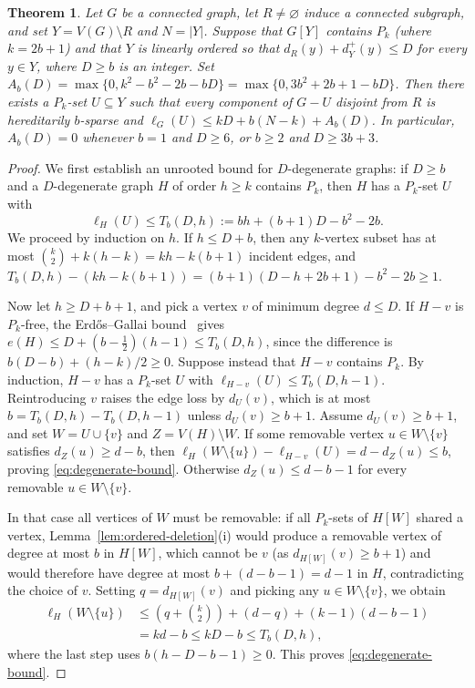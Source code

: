\documentclass[10pt]{article}
\theoremstyle{compactplain}
\newtheorem{theorem}{Theorem}[section]
\theoremstyle{remark}\newtheorem{remark}[theorem]{Remark}
\begin{document}
\begin{theorem}\label{thm:rooted-deletion}
Let $G$ be a connected graph, let $R\ne\varnothing$ induce a connected
subgraph, and set $Y=V(G)\setminus R$ and $N=|Y|$. Suppose that $G[Y]$
contains $P_k$ (where $k=2b+1$) and that $Y$ is linearly ordered so that
$d_R(y)+d_Y^+(y)\le D$ for every $y\in Y$, where $D\ge b$ is an integer.
Set $A_b(D)=\max\{0,k^2-b^2-2b-bD\}=\max\{0,3b^2+2b+1-bD\}$. Then there
exists a $P_k$-set $U\subseteq Y$ such that every component of $G-U$
disjoint from $R$ is hereditarily $b$-sparse and
$\ell_G(U)\le kD+b(N-k)+A_b(D)$. In particular, $A_b(D)=0$ whenever
$b=1$ and $D\ge6$, or $b\ge2$ and $D\ge3b+3$.
\end{theorem}
\begin{proof}
We first establish an unrooted bound for $D$-degenerate graphs: if
$D\ge b$ and a $D$-degenerate graph $H$ of order $h\ge k$ contains
$P_k$, then $H$ has a $P_k$-set $U$ with
\begin{equation}\label{eq:degenerate-bound}
 \ell_H(U)\le T_b(D,h):=bh+(b+1)D-b^2-2b.
\end{equation}
We proceed by induction on $h$. If $h\le D+b$, then any $k$-vertex
subset has at most $\binom{k}{2}+k(h-k)=kh-k(b+1)$ incident edges, and
$T_b(D,h)-(kh-k(b+1))=(b+1)(D-h+2b+1)-b^2-2b\ge1$.

Now let $h\ge D+b+1$, and pick a vertex $v$ of minimum degree $d\le D$.
If $H-v$ is $P_k$-free, the Erd\H{o}s--Gallai bound~\cite{EG} gives
$e(H)\le D+(b-\tfrac{1}{2})(h-1)\le T_b(D,h)$, since the difference is
$b(D-b)+(h-k)/2\ge0$. Suppose instead that $H-v$ contains $P_k$. By
induction, $H-v$ has a $P_k$-set $U$ with
$\ell_{H-v}(U)\le T_b(D,h-1)$. Reintroducing $v$ raises the edge loss by
$d_U(v)$, which is at most $b=T_b(D,h)-T_b(D,h-1)$ unless
$d_U(v)\ge b+1$. Assume $d_U(v)\ge b+1$, and set $W=U\cup\{v\}$ and
$Z=V(H)\setminus W$. If some removable vertex $u\in W\setminus\{v\}$
satisfies $d_Z(u)\ge d-b$, then
$\ell_H(W\setminus\{u\})-\ell_{H-v}(U)=d-d_Z(u)\le b$, proving
\eqref{eq:degenerate-bound}. Otherwise $d_Z(u)\le d-b-1$ for every
removable $u\in W\setminus\{v\}$.

In that case all vertices of $W$ must be removable: if all $P_k$-sets of
$H[W]$ shared a vertex, Lemma~\ref{lem:ordered-deletion}(i) would
produce a removable vertex of degree at most $b$ in $H[W]$, which cannot
be $v$ (as $d_{H[W]}(v)\ge b+1$) and would therefore have degree at most
$b+(d-b-1)=d-1$ in $H$, contradicting the choice of $v$. Setting
$q=d_{H[W]}(v)$ and picking any $u\in W\setminus\{v\}$, we obtain
\begin{align*}
 \ell_H(W\setminus\{u\})
 &\le\left(q+\binom{k}{2}\right)+(d-q)+(k-1)(d-b-1)\\
 &=kd-b\le kD-b\le T_b(D,h),
\end{align*}
where the last step uses $b(h-D-b-1)\ge0$. This proves
\eqref{eq:degenerate-bound}.


\end{proof}
\end{document}
